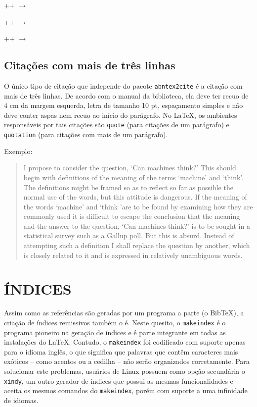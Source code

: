 \documentclass{fei}
\begin{document}
	\latexinline++ \(\to\) 

	\latexinline++ \(\to\) 

	\latexinline++ \(\to\) 
	
	\section{Citações com mais de três linhas}
	
	O único tipo de citação que independe do pacote \texttt{abntex2cite} é a citação com mais de três linhas. De acordo com o manual da biblioteca, ela deve ter recuo de 4 cm da margem esquerda, letra de tamanho 10 pt, espaçamento simples e não deve conter aspas nem recuo ao início do parágrafo. No \LaTeX, os ambientes responsáveis por tais citações são \texttt{quote} (para citações de um parágrafo) e \texttt{quotation} (para citações com mais de um parágrafo).
	
	Exemplo:
	
	\begin{quote}		
	I propose to consider the question, `Can machines think?' This should begin with definitions of the meaning of the terms `machine' and `think'. The definitions might be framed so as to reflect so far as possible the normal use of the words, but this attitude is dangerous. If the meaning of the words `machine' and `think 'are to be found by examining how they are commonly used it is difficult to escape the conclusion that the meaning and the answer to the question, `Can machines think?' is to be sought in a statistical survey such as a Gallup poll. But this is absurd. Instead of attempting such a definition I shall replace the question by another, which is closely related to it and is expressed in relatively unambiguous words. \cite{j:turing50}
	\end{quote}

	\chapter{ÍNDICES}\label{chap:indice}
	
	Assim como as referências são geradas por um programa a parte (o Bib\TeX), a criação de índices remissivos também o é. Neste quesito, o \texttt{makeindex} é o programa pioneiro na geração de índices e é parte integrante em todas as instalações do \LaTeX. Contudo, o \texttt{makeindex} foi codificado com suporte apenas para o idioma inglês, o que significa que palavras que contêm caracteres mais exóticos -- como acentos ou a cedilha -- não serão organizados corretamente. Para solucionar este problemas, usuários de Linux possuem como opção secundária o \texttt{xindy}, um outro gerador de índices que possui as mesmas funcionalidades e aceita os mesmos comandos do \texttt{makeindex}, porém com suporte a uma infinidade de idiomas.
	
\end{document}
